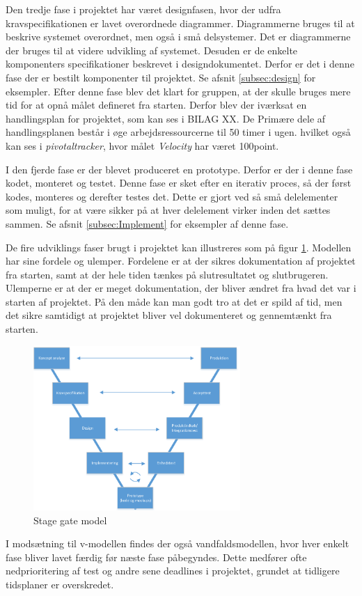 Den tredje fase i projektet har været designfasen, hvor der udfra kravspecifikationen er lavet overordnede diagrammer. Diagrammerne bruges til at beskrive systemet overordnet, men også i små delsystemer. Det er diagrammerne der bruges til at videre udvikling af systemet. Desuden er de enkelte komponenters specifikationer beskrevet i designdokumentet. Derfor er det i denne fase der er bestilt komponenter til projektet. Se afsnit \ref{subsec:design} for eksempler. Efter denne fase blev det klart for gruppen, at der skulle bruges mere tid for at opnå målet defineret fra starten. Derfor blev der iværksat en handlingsplan for projektet, som kan ses i BILAG XX. De Primære dele af handlingsplanen består i øge arbejdsressourcerne til 50 timer i ugen. hvilket også kan ses i \textit{pivotaltracker}, hvor målet \textit{Velocity} har været 100point. 

I den fjerde fase er der blevet produceret en prototype. Derfor er der i denne fase kodet, monteret og testet. Denne fase er sket efter en iterativ proces, så der først kodes, monteres og derefter testes det. Dette er gjort ved så små delelementer som muligt, for at være sikker på at hver delelement virker inden det sættes sammen. Se afsnit \ref{subsec:Implement} for eksempler af denne fase. 

De fire udviklings faser brugt i projektet kan illustreres som på figur \ref{fig:v-model}. Modellen har sine fordele og ulemper. Fordelene er at der sikres dokumentation af projektet fra starten, samt at der hele tiden tænkes på slutresultatet og slutbrugeren. Ulemperne er at der er meget dokumentation, der bliver ændret fra hvad det var i starten af projektet. På den måde kan man godt tro at det er spild af tid, men det sikre samtidigt at projektet bliver vel dokumenteret og gennemtænkt fra starten.

\begin{figure}[H]
	\centering
	\includegraphics[width=0.7\textwidth]{billeder/Hovedrapport/V-model.PDF}
	\caption{Stage gate model}
	\label{fig:v-model}
\end{figure}

I modsætning til v-modellen findes der også vandfaldsmodellen, hvor hver enkelt fase bliver lavet færdig før næste fase påbegyndes. Dette medfører ofte nedprioritering af test og andre sene deadlines i projektet, grundet at tidligere tidsplaner er overskredet.


